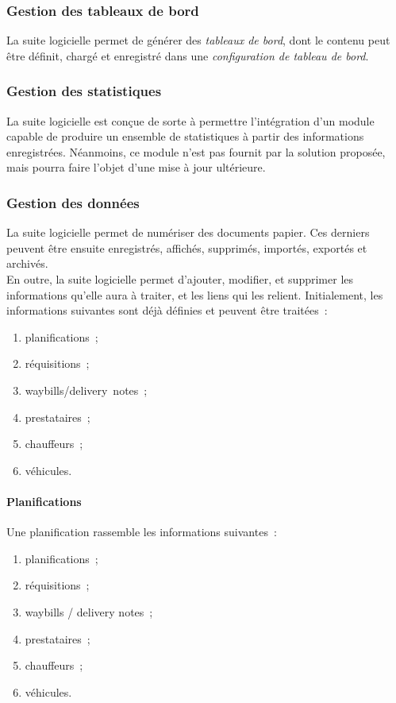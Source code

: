 \subsubsection{Gestion des tableaux de bord}
La suite logicielle permet de générer des \emph{tableaux de bord}, dont le contenu peut être définit, chargé et enregistré dans une \emph{configuration de tableau de bord}.

\subsubsection{Gestion des statistiques}
La suite logicielle est conçue de sorte à permettre l'intégration d'un module capable de produire un ensemble de statistiques à partir des informations enregistrées. Néanmoins, ce module n'est pas fournit par la solution proposée, mais pourra faire l'objet d'une mise à jour ultérieure.

\subsubsection{Gestion des données}
La suite logicielle permet de numériser des documents papier. Ces derniers peuvent être ensuite enregistrés, affichés, supprimés, importés, exportés et archivés.
\\
En outre, la suite logicielle permet d'ajouter, modifier, et supprimer les informations qu'elle aura à traiter, et les liens qui les relient. Initialement, les informations suivantes sont déjà définies et peuvent être traitées~:
\begin{enumerate}
	\item planifications~;
	\item réquisitions~;
	\item waybills/delivery~notes~;
	\item prestataires~;
	\item chauffeurs~;
	\item véhicules.
\end{enumerate}

\paragraph{Planifications}
Une planification rassemble les informations suivantes~:
\begin{enumerate}
	\item planifications~;
	\item réquisitions~;
	\item waybills / delivery notes~;
	\item prestataires~;
	\item chauffeurs~;
	\item véhicules.
\end{enumerate}

